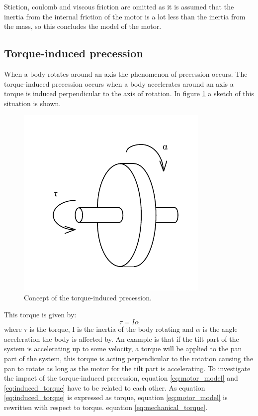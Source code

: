 Stiction, coulomb and viscous friction are omitted as it is assumed that the inertia from the internal friction of the motor is a lot less than the inertia from the mass, so this concludes the model of the motor.


  
\subsection{Torque-induced precession}
When a body rotates around an axis the phenomenon of precession occurs. The torque-induced precession occurs when a body accelerates around an axis a torque is induced perpendicular to the axis of rotation. In figure \ref{fig:precession} a sketch of this situation is shown.
\begin{figure}[htb]
	\centering
	\includegraphics[scale=1,trim=0 0 0 0]{graphics/precession.pdf} %
	\caption{Concept of the torque-induced precession.}
	\label{fig:precession}			%
\end{figure}
This torque is given by:
\begin{equation}
	\tau = I\alpha\label{eq:induced_torque}
\end{equation}
where $\tau$ is the torque, I is the inertia of the body rotating and $\alpha$ is the angle acceleration the body is affected by. An example is that if the tilt part of the system is accelerating up to some velocity, a torque will be applied to the pan part of the system, this torque is acting perpendicular to the rotation causing the pan to rotate as long as the motor for the tilt part is accelerating. To investigate the impact of the torque-induced precession, equation \ref{eq:motor_model} and \ref{eq:induced_torque} have to be related to each other. As equation \ref{eq:induced_torque} is expressed as torque, equation \ref{eq:motor_model} is rewritten with respect to torque. equation \ref{eq:mechanical_torque}.
